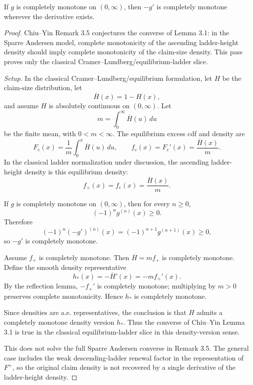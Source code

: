 \begin{lemma}
\label{res:chiu-yin-cm-derivative-reflection-lemma}
If \(g\) is completely monotone on \((0,\infty)\), then \(-g'\) is completely monotone wherever the derivative exists.
\end{lemma}
\begin{proof}
Chiu--Yin Remark 3.5 conjectures the converse of Lemma 3.1: in the Sparre Andersen model, complete monotonicity of the ascending ladder-height density should imply complete monotonicity of the claim-size density. This pass proves only the classical Cramer--Lundberg/equilibrium-ladder slice.

\emph{Setup.}
In the classical Cramer--Lundberg/equilibrium formulation, let \(H\) be the claim-size distribution, let
\[
\overline H(x)=1-H(x),
\]
and assume \(H\) is absolutely continuous on \((0,\infty)\). Let
\[
m=\int_0^\infty \overline H(u)\,du
\]
be the finite mean, with \(0<m<\infty\). The equilibrium excess cdf and density are
\[
F_e(x)=\frac1m\int_0^x\overline H(u)\,du,
\qquad
f_e(x)=F_e'(x)=\frac{\overline H(x)}{m}.
\]
In the classical ladder normalization under discussion, the ascending ladder-height density is this equilibrium density:
\[
f_+(x)=f_e(x)=\frac{\overline H(x)}{m}.
\]

If \(g\) is completely monotone on \((0,\infty)\), then for every \(n\ge0\),
\[
(-1)^n g^{(n)}(x)\ge0.
\]
Therefore
\[
(-1)^n(-g')^{(n)}(x)=(-1)^{n+1}g^{(n+1)}(x)\ge0,
\]
so \(-g'\) is completely monotone.

Assume \(f_+\) is completely monotone. Then \(\overline H=m f_+\) is completely monotone. Define the smooth density representative
\[
h_*(x)=-\overline H'(x)=-m f_+'(x).
\]
By the reflection lemma, \(-f_+'\) is completely monotone; multiplying by \(m>0\) preserves complete monotonicity. Hence \(h_*\) is completely monotone.

Since densities are a.e. representatives, the conclusion is that \(H\) admits a completely monotone density version \(h_*\). Thus the converse of Chiu--Yin Lemma 3.1 is true in the classical equilibrium-ladder slice in this density-version sense.

This does not solve the full Sparre Andersen converse in Remark 3.5. The general case includes the weak descending-ladder renewal factor in the representation of \(F^+\), so the original claim density is not recovered by a single derivative of the ladder-height density.
\end{proof}

